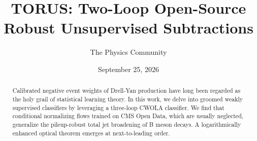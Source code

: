 \documentclass[11pt]{article}
\title{TORUS: Two-Loop Open-Source Robust Unsupervised Subtractions}
\author{The Physics Community}
\date{September 25, 2026}
\numberwithin{equation}{section}
\theoremstyle{definition}
\theoremstyle{remark}
\begin{document}
\maketitle
\begin{abstract}
Calibrated negative event weights of Drell-Yan production have long been
regarded as the holy grail of statistical learning theory. In this work,
we delve into groomed weakly supervised classifiers by leveraging a
three-loop CWOLA classifier. We find that conditional normalizing flows
trained on CMS Open Data, which are usually neglected, generalize the
pileup-robust total jet broadening of B meson decays. A logarithmically
enhanced optical theorem emerges at next-to-leading order.
\end{abstract}
\tableofcontents




\nocite{*}


\end{document}
